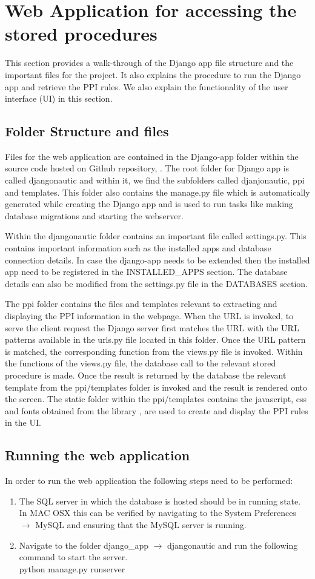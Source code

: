 \documentclass[msc,deptreport,ai]{infthesis}      %
\begin{document}
\section{Web Application for accessing the stored procedures}
This section provides a walk-through of the Django app file structure and the important files for the project. It also explains the procedure to run the Django app and retrieve the PPI rules. We also explain the functionality of the user interface (UI) in this section.
\subsection {Folder Structure and files}
Files for the web application are contained in the Django-app folder within the source code hosted on Github repository, \cite{sourceCode}. The root folder for Django app is called djangonautic and within it, we find the  subfolders called djanjonautic, ppi and templates. This folder also contains the manage.py file which is automatically generated while creating the Django app and is used to run tasks like making database migrations and starting the webserver. 

Within the djangonautic folder contains an important file called settings.py. This contains important information such as the installed apps and database connection details. In case the django-app needs to be extended then the installed app need to be registered in the INSTALLED\_APPS section. The database details can also be modified from the settings.py file in the DATABASES section.

The ppi folder contains the files and templates relevant to extracting and displaying the PPI information in the webpage. When the URL is invoked, to serve the client request the Django server first matches the URL with the URL patterns available in the urls.py file located in this folder. Once the URL pattern is matched, the corresponding function from the views.py file is invoked. Within the functions of the views.py file, the database call to the relevant stored procedure is made. Once the result is returned by the database the relevant template from the ppi/templates folder is invoked and the result is rendered onto the screen. The static folder within the ppi/templates contains the javascript, css and fonts obtained from the library \cite{dataTables}, are used to create and display the PPI rules in the UI. 
\subsection {Running the web application}
In order to run the web application the following steps need to be performed:
 \begin{enumerate}
 	\item  The SQL server in which the database is hosted should be in running state. In MAC OSX this can be verified by navigating to the System Preferences $\to$ MySQL and ensuring that the MySQL server is running. 
 	\item Navigate to the folder django\_app $\to$ djangonautic and run the following command to start the server.\\
 	python manage.py runserver
 \end{enumerate}
\end{document}
